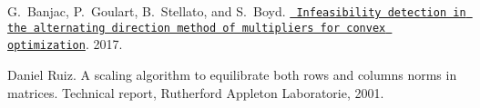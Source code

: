 
\begin{DoxyDescription}
\item[\label{citelist_CITEREF_osqp-infeasibility}%
\Hypertarget{citelist_CITEREF_osqp-infeasibility}%
\mbox{[}1\mbox{]}]G.~Banjac, P.~Goulart, B.~Stellato, and S.~Boyd. \href{https://stanford.edu/~boyd/papers/pdf/admm_infeas.pdf}{\texttt{ Infeasibility detection in the alternating direction method of multipliers for convex optimization}}. 2017.


\item[\label{citelist_CITEREF_ruiz2001scaling}%
\Hypertarget{citelist_CITEREF_ruiz2001scaling}%
\mbox{[}2\mbox{]}]Daniel Ruiz. A scaling algorithm to equilibrate both rows and columns norms in matrices. Technical report, Rutherford Appleton Laboratorie, 2001.


\end{DoxyDescription}